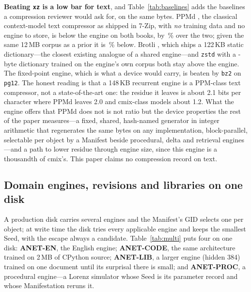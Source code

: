 \documentclass[11pt,a4paper]{article}
\theoremstyle{definition}
\theoremstyle{plain}
\theoremstyle{remark}
\begin{document}
\textbf{Beating \texttt{xz} is a low bar for text}, and Table~\ref{tab:baselines} adds the
baselines a compression reviewer would ask for, on the same bytes. PPMd \citep{cleary1984,shkarin2002}, the
classical context-model text compressor as shipped in 7-Zip, with \emph{no} training data and no
engine to store, is below the engine on both books, by \ppmdGap{}\,\% over the two; given the same
12\,MB corpus as a prior it is \ppmdPriorGap{}\,\% below. Brotli \citep{alakuijala2016brotli}, which
ships a 122\,KB static dictionary---the closest existing analogue of a shared engine---and
\texttt{zstd} with a \baselineDictBytes{}-byte dictionary trained on the engine's own corpus
\citep{collet2021zstd} both stay above the engine. The fixed-point engine, which is what a
device would carry, is beaten by \texttt{bz2} on \texttt{pg12}. The honest reading is that a
148\,KB recurrent engine is a PPM-class text compressor, not a state-of-the-art one: the residue it
leaves is about 2.1 bits per character where PPMd leaves 2.0 and cmix-class models about 1.2.
What the engine offers that PPMd does not is not ratio but the device properties the rest of the
paper measures---a fixed, shared, hash-named generator in integer arithmetic that regenerates the
same bytes on any implementation, block-parallel, selectable per object by a Manifest beside
procedural, delta and retrieval engines---and a path to lower residue through engine size, since
this engine is a thousandth of cmix's. This paper claims no compression record on text.

\begin{table}[!htb]
\centering\small
\caption{Stronger baselines on the two held-out books (ratio to raw; same byte strings as
Table~\ref{tab:n8}; bold = best without a prior). ``$+$ dict'' is \texttt{zstd --ultra -22} with
a \baselineDictBytes{}-byte dictionary trained on the engine's 12\,MB corpus; ``$\mid$ prior'' is
$|\mathrm{compress}(\mathrm{corpus}\,\|\,\mathrm{book})|-|\mathrm{compress}(\mathrm{corpus})|$, the
compressor given the engine's corpus. Reproduced by \texttt{baselines.py}.}
\label{tab:baselines}
{\scriptsize\setlength{\tabcolsep}{2.6pt}\baselineTable{}}
\end{table}


\subsection{Domain engines, revisions and libraries on one disk}
\label{sec:multi}
A production disk carries several engines and the Manifest's GID selects one per object; at write
time the disk tries every applicable engine and keeps the smallest Seed, with the escape always a
candidate. Table~\ref{tab:multi} puts four on one disk: \textbf{ANET-EN}, the English engine;
\textbf{ANET-CODE}, the same architecture trained on 2\,MB of CPython source; \textbf{ANET-LIB},
a larger engine (hidden 384) trained on one document until its surprisal there is small; and
\textbf{ANET-PROC}, a procedural engine---a Lorenz simulator \citep{lorenz1963} whose Seed is its
parameter record and whose Manifestation reruns it.
\end{document}
